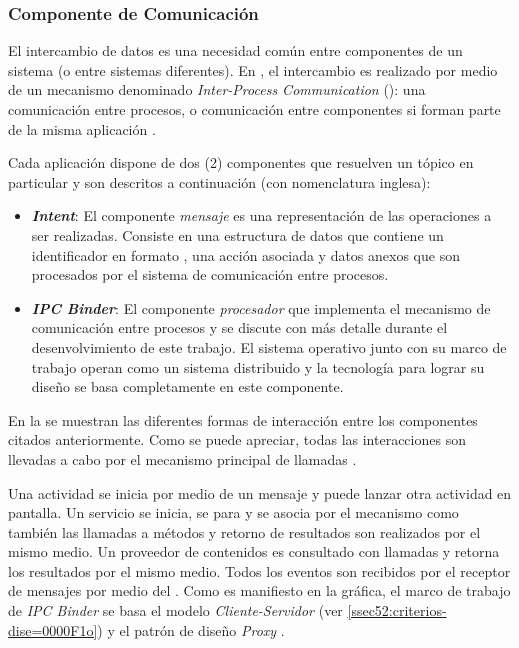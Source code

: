 \subsubsection{Componente de Comunicación}

El intercambio de datos es una necesidad común entre componentes de
un sistema (o entre sistemas diferentes). En \emph{},
el intercambio es realizado por medio de un mecanismo denominado \emph{Inter-Process
Communication} (): una comunicación entre procesos, o comunicación
entre componentes si forman parte de la misma aplicación \cite{Schreiber2011}. 

Cada aplicación dispone de dos (2) componentes que resuelven un tópico
en particular y son descritos a continuación (con nomenclatura inglesa):
\begin{itemize}
\item \textbf{\emph{Intent}}: El componente \emph{mensaje} es una representación
de las operaciones a ser realizadas. Consiste en una estructura de
datos que contiene un identificador en formato , una acción
asociada y datos anexos que son procesados por el sistema de comunicación
entre procesos. 
\item \textbf{\emph{IPC Binder}}: El componente \emph{procesador} que implementa
el mecanismo de comunicación entre procesos \emph{\cite{Schreiber2011}}
y se discute con más detalle durante el desenvolvimiento de este trabajo\emph{.
}El sistema operativo\emph{ } junto con su marco de
trabajo operan como un sistema distribuido y la tecnología para lograr
su diseño se basa completamente en este componente.
\end{itemize}
En la  se muestran las diferentes formas
de interacción entre los componentes \emph{ }citados
anteriormente. Como se puede apreciar, todas las interacciones son
llevadas a cabo por el mecanismo principal de llamadas .

Una actividad se inicia por medio de un mensaje y puede lanzar otra
actividad en pantalla. Un servicio se inicia, se para y se asocia
por el mecanismo  como también las llamadas a métodos y
retorno de resultados son realizados por el mismo medio. Un proveedor
de contenidos es consultado con llamadas  y retorna los
resultados por el mismo medio. Todos los eventos son recibidos por
el receptor de mensajes por medio del . Como es manifiesto
en la gráfica, el marco de trabajo de \emph{IPC Binder} se basa el
modelo \emph{Cliente-Servidor} (ver \ref{ssec52:criterios-dise=0000F1o})
y el patrón de diseño \emph{Proxy} \cite{Shalloway2004}.

